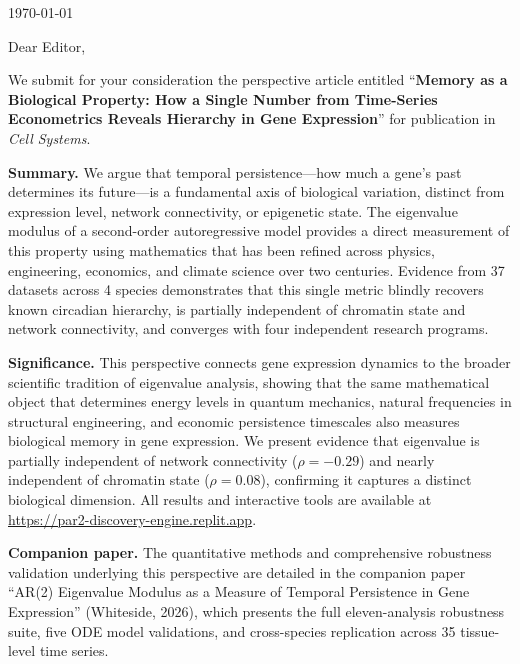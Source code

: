 \documentclass[11pt,letterpaper]{article}
\begin{document}
\today

\vspace{1cm}

Dear Editor,

\vspace{0.5cm}

We submit for your consideration the perspective article entitled ``\textbf{Memory as a Biological Property: How a Single Number from Time-Series Econometrics Reveals Hierarchy in Gene Expression}'' for publication in \textit{Cell Systems}.

\vspace{0.3cm}

\textbf{Summary.} We argue that temporal persistence---how much a gene's past determines its future---is a fundamental axis of biological variation, distinct from expression level, network connectivity, or epigenetic state. The eigenvalue modulus of a second-order autoregressive model provides a direct measurement of this property using mathematics that has been refined across physics, engineering, economics, and climate science over two centuries. Evidence from 37 datasets across 4 species demonstrates that this single metric blindly recovers known circadian hierarchy, is partially independent of chromatin state and network connectivity, and converges with four independent research programs.

\vspace{0.3cm}

\textbf{Significance.} This perspective connects gene expression dynamics to the broader scientific tradition of eigenvalue analysis, showing that the same mathematical object that determines energy levels in quantum mechanics, natural frequencies in structural engineering, and economic persistence timescales also measures biological memory in gene expression. We present evidence that eigenvalue is partially independent of network connectivity ($\rho = -0.29$) and nearly independent of chromatin state ($\rho = 0.08$), confirming it captures a distinct biological dimension. All results and interactive tools are available at \url{https://par2-discovery-engine.replit.app}.

\vspace{0.3cm}

\textbf{Companion paper.} The quantitative methods and comprehensive robustness validation underlying this perspective are detailed in the companion paper ``AR(2) Eigenvalue Modulus as a Measure of Temporal Persistence in Gene Expression'' (Whiteside, 2026), which presents the full eleven-analysis robustness suite, five ODE model validations, and cross-species replication across 35 tissue-level time series.
\end{document}
